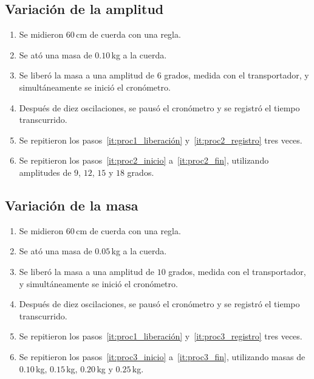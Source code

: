 \documentclass[letterpaper]{report}
\numberwithin{table}{section}
\begin{document}
\subsection{Variación de la amplitud}

\begin{enumerate}
  \item Se midieron 60\,cm de cuerda con una regla.\label{it:proc2_inicio}
  \item Se ató una masa de $0.10$\,kg a la cuerda.
  \item Se liberó la masa a una amplitud de $6$ grados, medida con
    el transportador, y simultáneamente se inició el
    cronómetro.
  \item Después de diez oscilaciones, se pausó el cronómetro y se
    registró el tiempo transcurrido.\label{it:proc2_registro}
  \item Se repitieron los pasos~\ref{it:proc1_liberación}
    y~\ref{it:proc2_registro} tres veces.\label{it:proc2_fin}
  \item Se repitieron los pasos~\ref{it:proc2_inicio}
    a~\ref{it:proc2_fin}, utilizando amplitudes de
    $9$, $12$, $15$ y $18$ grados.
\end{enumerate}

\subsection{Variación de la masa}

\begin{enumerate}
  \item Se midieron 60\,cm de cuerda con una regla.\label{it:proc3_inicio}
  \item Se ató una masa de $0.05$\,kg a la cuerda.
  \item Se liberó la masa a una amplitud de $10$ grados, medida con
    el transportador, y simultáneamente se inició el
    cronómetro.
  \item Después de diez oscilaciones, se pausó el cronómetro y se
    registró el tiempo transcurrido.\label{it:proc3_registro}
  \item Se repitieron los pasos~\ref{it:proc1_liberación}
    y~\ref{it:proc3_registro} tres veces.\label{it:proc3_fin}
  \item Se repitieron los pasos~\ref{it:proc3_inicio}
    a~\ref{it:proc3_fin}, utilizando masas de
    $0.10$\,kg, $0.15$\,kg, $0.20$\,kg y $0.25$\,kg.
\end{enumerate}

\newpage
\end{document}
